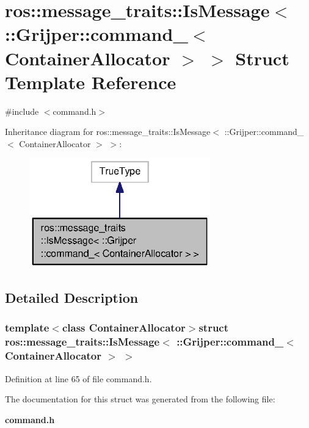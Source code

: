 \section{ros\-:\-:message\-\_\-traits\-:\-:Is\-Message$<$ \-:\-:Grijper\-:\-:command\-\_\-$<$ Container\-Allocator $>$ $>$ Struct Template Reference}
\label{structros_1_1message__traits_1_1IsMessage_3_01_1_1Grijper_1_1command___3_01ContainerAllocator_01_4_01_4}


{\ttfamily \#include $<$command.\-h$>$}



Inheritance diagram for ros\-:\-:message\-\_\-traits\-:\-:Is\-Message$<$ \-:\-:Grijper\-:\-:command\-\_\-$<$ Container\-Allocator $>$ $>$\-:\nopagebreak
\begin{figure}[H]
\begin{center}
\leavevmode
\includegraphics[width=222pt]{structros_1_1message__traits_1_1IsMessage_3_01_1_1Grijper_1_1command___3_01ContainerAllocator_01_4_01_4__inherit__graph}
\end{center}
\end{figure}


\subsection{Detailed Description}
\subsubsection*{template$<$class Container\-Allocator$>$struct ros\-::message\-\_\-traits\-::\-Is\-Message$<$ \-::\-Grijper\-::command\-\_\-$<$ Container\-Allocator $>$ $>$}



Definition at line 65 of file command.\-h.



The documentation for this struct was generated from the following file\-:\begin{DoxyCompactItemize}
\item 
{\bf command.\-h}\end{DoxyCompactItemize}
